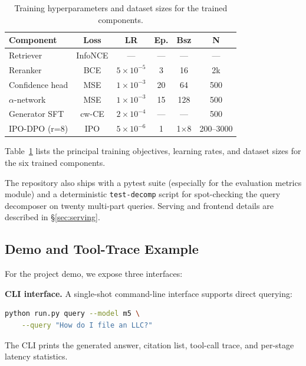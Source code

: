 \documentclass[11pt,a4paper,twocolumn]{article}
\begin{document}
\begin{table}[H]
\centering\scriptsize
\setlength{\tabcolsep}{3pt}
\begin{tabular}{lccccc}
\toprule
\textbf{Component} & \textbf{Loss} & \textbf{LR} & \textbf{Ep.} & \textbf{Bsz} & \textbf{N} \\
\midrule
Retriever         & InfoNCE & --- & --- & --- & --- \\
Reranker          & BCE     & $5{\times}10^{-5}$ & 3 & 16  & 2k \\
Confidence head   & MSE     & $1{\times}10^{-3}$ & 20& 64  & 500 \\
$\alpha$-network  & MSE     & $1{\times}10^{-3}$ & 15& 128 & 500 \\
Generator SFT     & cw-CE   & $2{\times}10^{-4}$ & --- & --- & 500 \\
IPO-DPO (r=8)     & IPO     & $5{\times}10^{-6}$ & 1 & 1{\small$\times$}8  & 200--3000 \\
\bottomrule
\end{tabular}
\caption{Training hyperparameters and dataset sizes for the trained components.}\label{tab:hparams}
\end{table}

Table~\ref{tab:hparams} lists the principal training objectives,
learning rates, and dataset sizes for the six trained components.


{\raggedright
The repository also ships with a pytest suite (especially for the
evaluation metrics module) and a deterministic \texttt{test-decomp}
script for spot-checking the query decomposer on twenty multi-part
queries. Serving and frontend details are described in
\S\ref{sec:serving}.\par}

\subsection{Demo and Tool-Trace Example}\label{sec:demo}

For the project demo, we expose three interfaces:

\textbf{CLI interface.}
A single-shot command-line interface supports direct querying:

\begin{lstlisting}[language=bash]
python run.py query --model m5 \
    --query "How do I file an LLC?"
\end{lstlisting}

The CLI prints the generated answer, citation list, tool-call trace,
and per-stage latency statistics.
\end{document}
